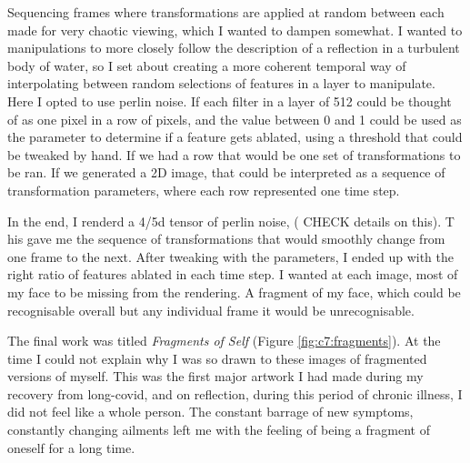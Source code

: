 Sequencing frames where transformations are applied at random between each made for very chaotic viewing, which I wanted to dampen somewhat. 
I wanted to manipulations to more closely follow the description of a reflection in a turbulent body of water, so I set about creating a more coherent temporal way of interpolating between random selections of features in a layer to manipulate. 
Here I opted to use perlin noise. If each filter in a layer of 512 could be thought of as one pixel in a row of pixels, and the value between 0 and 1 could be used as the parameter to determine if a feature gets ablated, using a threshold that could be tweaked by hand. 
If we had a row that would be one set of transformations to be ran. 
If we generated a 2D image, that could be interpreted as a sequence of transformation parameters, where each row represented one time step.

In the end, I renderd a 4/5d tensor of perlin noise, ( CHECK details on this). T
his gave me the sequence of transformations that would smoothly change from one frame to the next. 
After tweaking with the parameters, I ended up with the right ratio of features ablated in each time step. 
I wanted at each image, most of my face to be missing from the rendering. 
A fragment of my face, which could be recognisable overall but any individual frame it would be unrecognisable. 

The final work was titled \textit{Fragments of Self} (Figure \ref{fig:c7:fragments}). 
At the time I could not explain why I was so drawn to these images of fragmented versions of myself. 
This was the first major artwork I had made during my recovery from long-covid, and on reflection, during this period of chronic illness, I did not feel like a whole person. 
The constant barrage of new symptoms, constantly changing ailments left me with the feeling of being a fragment of oneself for a long time.


